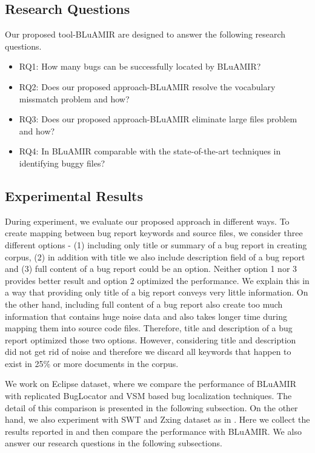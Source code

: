 \documentclass[conference]{IEEEtran}
\begin{document}
\subsection{Research Questions}
Our proposed tool-BLuAMIR are designed to  answer the following research questions.
\begin{itemize}
	\item RQ1: How many bugs can be successfully located by BLuAMIR?
	\item RQ2: Does our proposed approach-BLuAMIR resolve the vocabulary missmatch problem and how?
	\item RQ3: Does our proposed approach-BLuAMIR eliminate large files problem and how?
	\item RQ4: In BLuAMIR comparable with the state-of-the-art techniques in identifying buggy files?
\end{itemize}






\subsection{Experimental Results}
During experiment, we evaluate our proposed approach in different ways. To create mapping between bug report keywords and source files, we consider three different options - (1) including only title or summary of a bug report in creating corpus, (2) in addition with title we also include description field of a bug report and (3) full content of a bug report could be an option. Neither option 1 nor 3 provides better result and option 2 optimized the performance. We explain this in a way that providing only title of a big report conveys very little information. On the other hand, including full content of a bug report also create too much information that contains huge noise data and also takes longer time during mapping them into source code files. Therefore, title and description of a bug report optimized those two options. However, considering title and description did not get rid of noise and therefore we discard all keywords that happen to exist in 25\% or more documents in the corpus.

We work on Eclipse dataset, where we compare the performance of BLuAMIR with replicated BugLocator \cite{Jian} and VSM based bug localization techniques. The detail of this comparison is presented in the following subsection.
On the other hand, we also experiment with SWT and Zxing dataset as in \cite{Jian}. Here we collect the results reported in \cite{Jian} and then compare the performance with BLuAMIR. We also answer our research questions in the following subsections.
\end{document}

